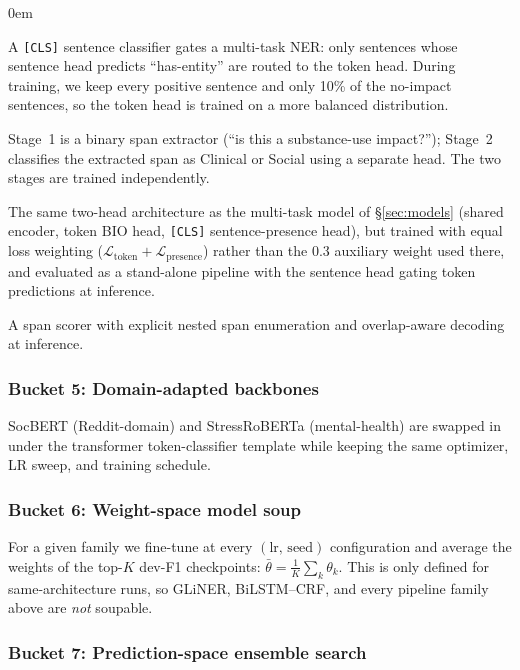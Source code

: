 \documentclass[11pt]{article}
\begin{document}
\begin{description}
\itemsep0em
\item[Hierarchical DeBERTa.] A \texttt{[CLS]} sentence classifier gates a multi-task NER: only sentences whose sentence head predicts ``has-entity'' are routed to the token head. During training, we keep every positive sentence and only 10\% of the no-impact sentences, so the token head is trained on a more balanced distribution.
\item[Two-Step Impact Pipeline.] Stage~1 is a binary span extractor (``is this a substance-use impact?''); Stage~2 classifies the extracted span as Clinical or Social using a separate head. The two stages are trained independently.
\item[Sentence~$+$~Token Hierarchy.] The same two-head architecture as
the multi-task model of \S\ref{sec:models} (shared encoder, token BIO
head, \texttt{[CLS]} sentence-presence head), but trained with equal
loss weighting ($\mathcal{L}_{\text{token}}+\mathcal{L}_{\text{presence}}$)
rather than the $0.3$ auxiliary weight used there, and evaluated as a
stand-alone pipeline with the sentence head gating token predictions at
inference.
\item[Span-nested GLiNER.] A span scorer with explicit nested span enumeration and overlap-aware decoding at inference.
\end{description}

\subsubsection{Bucket 5: Domain-adapted backbones}
SocBERT (Reddit-domain) and StressRoBERTa (mental-health) are swapped in under the transformer token-classifier template while keeping the same optimizer, LR sweep, and training schedule.

\subsubsection{Bucket 6: Weight-space model soup}
For a given family we fine-tune at every $(\mathrm{lr},\,\mathrm{seed})$ configuration and average the weights of the top-$K$ dev-F1 checkpoints: $\bar\theta = \tfrac{1}{K}\sum_k \theta_k$. This is only defined for same-architecture runs, so GLiNER, BiLSTM--CRF, and every pipeline family above are \emph{not} soupable.

\subsubsection{Bucket 7: Prediction-space ensemble search}
\label{sec:ensemble}
\end{document}
